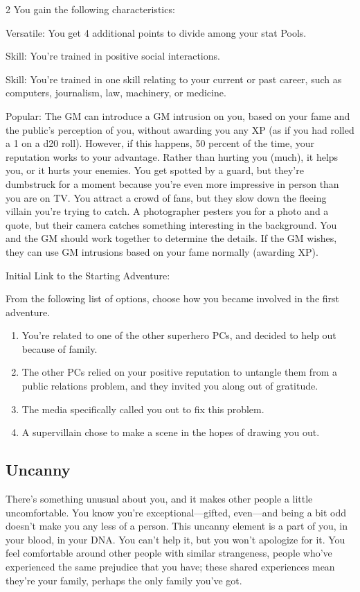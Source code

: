 \begin{multicols}{2}
You gain the following characteristics:

Versatile: You get 4 additional points to divide among your stat Pools.

Skill: You’re trained in positive social interactions.

Skill: You’re trained in one skill relating to your current or past career, such as computers, journalism, law, machinery, or medicine.

Popular: The GM can introduce a GM intrusion on you, based on your fame and the public’s perception of you, without awarding you any XP (as if you had rolled a 1 on a d20 roll). However, if this happens, 50 percent of the time, your reputation works to your advantage. Rather than hurting you (much), it helps you, or it hurts your enemies. You get spotted by a guard, but they’re dumbstruck for a moment because you’re even more impressive in person than you are on TV. You attract a crowd of fans, but they slow down the fleeing villain you’re trying to catch. A photographer pesters you for a photo and a quote, but their camera catches something interesting in the background. You and the GM should work together to determine the details. If the GM wishes, they can use GM intrusions based on your fame normally (awarding XP).

Initial Link to the Starting Adventure:

From the following list of options, choose how you became involved in the first adventure.

\begin{enumerate}
\item You’re related to one of the other superhero PCs, and decided to help out because of family.
\item The other PCs relied on your positive reputation to untangle them from a public relations problem, and they invited you along out of gratitude.
\item The media specifically called you out to fix this problem.
\item A supervillain chose to make a scene in the hopes of drawing you out.
\end{enumerate}

\subsection{Uncanny}

There’s something unusual about you, and it makes other people a little uncomfortable. You know you’re exceptional—gifted, even—and being a bit odd doesn’t make you any less of a person. This uncanny element is a part of you, in your blood, in your DNA. You can’t help it, but you won’t apologize for it. You feel comfortable around other people with similar strangeness, people who’ve experienced the same prejudice that you have; these shared experiences mean they’re your family, perhaps the only family you’ve got.


\end{multicols}
